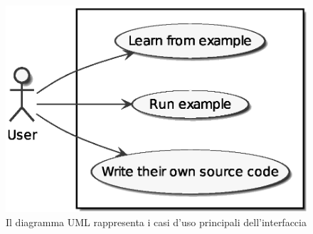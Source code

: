     \begin{figure}[htbp]
      \centering
      \includegraphics[width=.6\textwidth]{res/uml/use-cases-frontend.eps}%
      \caption{Il diagramma UML rappresenta i casi d'uso principali dell'interfaccia}%
      \label{fig:uml-use-case}
    \end{figure}
